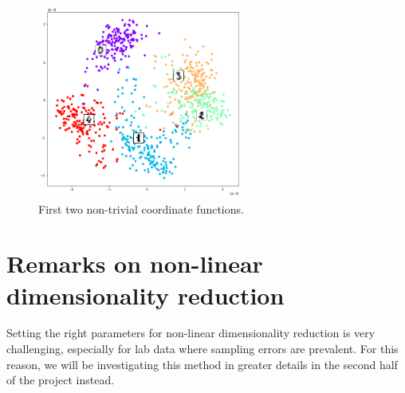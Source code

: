   \begin{figure}[H]
            \includegraphics[width=0.6\textwidth]{presentation/mnist.png}
        \caption{First two non-trivial coordinate functions.}    
        \end{figure} 
        
\section{Remarks on non-linear dimensionality reduction}
Setting the right parameters for non-linear dimensionality reduction is very challenging, especially for lab data where sampling errors are prevalent. For this reason, we will be investigating this method in greater details in the second half of the project instead.  